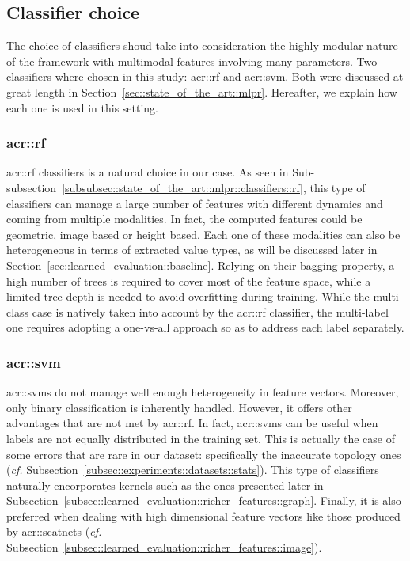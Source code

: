     \subsection{Classifier choice}
        \label{subsec::learned_evaluation::classification::classifiers}
        The choice of classifiers shoud take into consideration the highly modular nature of the framework with multimodal features involving many parameters.
        Two classifiers where chosen in this study: \gls{acr::rf} and \gls{acr::svm}.
        Both were discussed at great length in Section~\ref{sec::state_of_the_art::mlpr}.
        Hereafter, we explain how each one is used in this setting.\\

        \subsubsection{\acrlong*{acr::rf}}
            \gls{acr::rf} classifiers is a natural choice in our case.
            As seen in Sub-subsection~\ref{subsubsec::state_of_the_art::mlpr::classifiers::rf}, this type of classifiers can manage a large number of features with different dynamics and coming from multiple modalities.
            In fact, the computed features could be geometric, image based or height based.
            Each one of these modalities can also be heterogeneous in terms of extracted value types, as will be discussed later in Section~\ref{sec::learned_evaluation::baseline}.
            Relying on their bagging property, a high number of trees is required to cover most of the feature space, while a limited tree depth is needed to avoid overfitting during training.
            While the multi-class case is natively taken into account by the \gls{acr::rf} classifier, the multi-label one requires adopting a one-vs-all approach so as to address each label separately.

        \subsubsection{\acrshort*{acr::svm}}
            \glspl{acr::svm} do not manage well enough heterogeneity in feature vectors.
            Moreover, only binary classification is inherently handled.
            However, it offers other advantages that are not met by \gls{acr::rf}.
            In fact, \glspl{acr::svm} can be useful when labels are not equally distributed in the training set.
            This is actually the case of some errors that are rare in our dataset: specifically the inaccurate topology ones (\textit{cf.} Subsection~\ref{subsec::experiments::datasets::stats}).
            This type of classifiers naturally encorporates kernels such as the ones presented later in Subsection~\ref{subsec::learned_evaluation::richer_features::graph}.
            Finally, it is also preferred when dealing with high dimensional feature vectors like those produced by \glspl{acr::scatnet} (\textit{cf.} Subsection~\ref{subsec::learned_evaluation::richer_features::image}).

